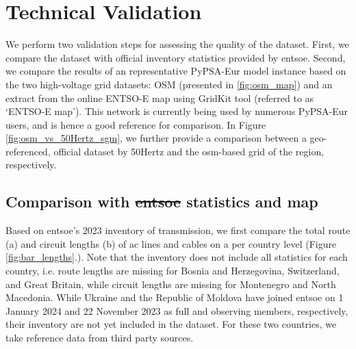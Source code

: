 \documentclass[fleqn,10pt]{wlscirep}
\let\autocite\cite
\providecommand{\DIFaddtex}[1]{{\protect\color{blue}\uwave{#1}}} %
\providecommand{\DIFdeltex}[1]{{\protect\color{red}\sout{#1}}}                      %
\providecommand{\DIFaddbegin}{} %
\providecommand{\DIFaddend}{} %
\providecommand{\DIFdelbegin}{} %
\providecommand{\DIFdelend}{} %
\providecommand{\DIFadd}[1]{\texorpdfstring{\DIFaddtex{#1}}{#1}} %
\providecommand{\DIFdel}[1]{\texorpdfstring{\DIFdeltex{#1}}{}} %
\begin{document}
\section*{Technical Validation}
\DIFaddbegin \label{sec:technical-validation}
\DIFaddend We perform two validation steps for assessing the quality of the dataset. First, we compare the dataset with official inventory statistics provided by \acrshort{entsoe}. Second, we compare the results of an representative PyPSA-Eur model instance based on the two high-voltage grid datasets: OSM (presented in \ref{fig:osm_map}) and an extract from the online ENTSO-E map using GridKit tool (referred to as ‘ENTSO-E map’).\autocite{wiegmansGridKitExtractENTSOE2016} This network is currently being used by numerous PyPSA-Eur users, and is hence a good reference for comparison. In Figure \ref{fig:osm_vs_50Hertz_sgm}, we further provide a comparison between a geo-referenced, official dataset by 50Hertz\autocite{50hertzStaticGridModel2022} and the \acrshort{osm}-based grid of the region, respectively.

\subsection*{Comparison with \DIFdelbegin \DIFdel{\acrshort{entsoe} }\DIFdelend \DIFaddbegin \DIFadd{ENTSO-E }\DIFaddend statistics and map}
\DIFaddbegin {}
\DIFaddend Based on \acrshort{entsoe}'s 2023 inventory of transmission,\autocite{entso-eInventoryTransmission20232024} we first compare the total route (a) and circuit lengths (b) of \acrshort{ac} lines and cables on a per country level (Figure \ref{fig:bar_lengths}.). Note that the inventory does not include all statistics for each country, i.e. route lengths are missing for Bosnia and Herzegovina, Switzerland, and Great Britain, while circuit lengths are missing for Montenegro and North Macedonia. While Ukraine and the Republic of Moldova have joined \acrshort{entsoe} on 1 January 2024 and 22 November 2023 as full and observing members, respectively, their inventory are not yet included in the dataset. For these two countries, we take reference data from third party sources.\autocite{cigrePowerSystemUkraine2018,globaldataTopFiveTransmission2023,moldelectricaTechnicalEconomicIndicators2023}
\end{document}
